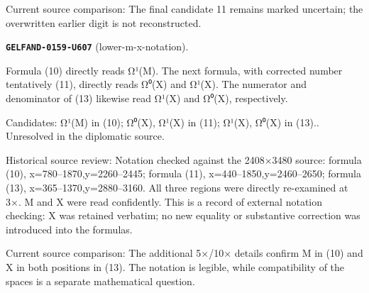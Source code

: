 Current source comparison: The final candidate 11 remains marked uncertain; the overwritten earlier digit is not reconstructed.\par\medskip
\par\noindent\leavevmode{}\label{GELFAND-0159-U607}\label{GELFAND-P001474:lower-m-x-notation}\textbf{\texttt{GELFAND-0159-U607}} (lower-m-x-notation).\nopagebreak[4]\par
Formula (10) directly reads Ω¹(M). The next formula, with corrected number tentatively (11), directly reads Ω⁰(X) and Ω¹(X). The numerator and denominator of (13) likewise read Ω¹(X) and Ω⁰(X), respectively.\par
Candidates: Ω¹(M) in (10); Ω⁰(X), Ω¹(X) in (11); Ω¹(X), Ω⁰(X) in (13).. Unresolved in the diplomatic source.\par
Historical source review: Notation checked against the 2408×3480 source: formula (10), x=780–1870,y=2260–2445; formula (11), x=440–1850,y=2460–2650; formula (13), x=365–1370,y=2880–3160. All three regions were directly re-examined at 3×. M and X were read confidently. This is a record of external notation checking: X was retained verbatim; no new equality or substantive correction was introduced into the formulas.\par
Current source comparison: The additional 5×/10× details confirm M in (10) and X in both positions in (13). The notation is legible, while compatibility of the spaces is a separate mathematical question.\par\medskip
